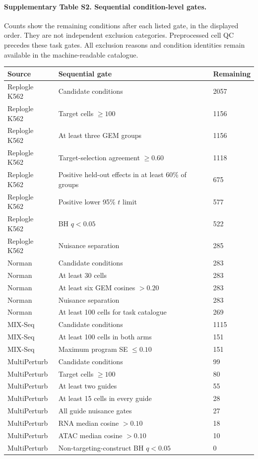 \documentclass[a4paper,fleqn]{cas-sc}
\makeatletter
\DeclareRobustCommand{\rev}[1]{{\color{red}\def\@citecolor{black}\def\@linkcolor{red}\def\@urlcolor{red}#1}}
\makeatother
\begin{document}
\paragraph{Supplementary Table S2. Sequential condition-level gates.}
Counts show the remaining conditions after each listed gate, in the displayed order. They are not independent exclusion categories. Preprocessed cell QC precedes these task gates. All exclusion reasons and condition identities remain available in the machine-readable catalogue.
\begin{longtable}{p{}p{}p{}}
\toprule
\rev{Source} & \rev{Sequential gate} & \rev{Remaining}\\
\midrule
\endhead
\rev{Replogle K562} & \rev{Candidate conditions} & \rev{2057}\\
\rev{Replogle K562} & \rev{Target cells $\geq100$} & \rev{1156}\\
\rev{Replogle K562} & \rev{At least three GEM groups} & \rev{1156}\\
\rev{Replogle K562} & \rev{Target-selection agreement $\geq0.60$} & \rev{1118}\\
\rev{Replogle K562} & \rev{Positive held-out effects in at least 60\% of groups} & \rev{675}\\
\rev{Replogle K562} & \rev{Positive lower 95\% $t$ limit} & \rev{577}\\
\rev{Replogle K562} & \rev{BH $q<0.05$} & \rev{522}\\
\rev{Replogle K562} & \rev{Nuisance separation} & \rev{285}\\
\rev{Norman} & \rev{Candidate conditions} & \rev{283}\\
\rev{Norman} & \rev{At least 30 cells} & \rev{283}\\
\rev{Norman} & \rev{At least six GEM cosines $>0.20$} & \rev{283}\\
\rev{Norman} & \rev{Nuisance separation} & \rev{283}\\
\rev{Norman} & \rev{At least 100 cells for task catalogue} & \rev{269}\\
\rev{MIX-Seq} & \rev{Candidate conditions} & \rev{1115}\\
\rev{MIX-Seq} & \rev{At least 100 cells in both arms} & \rev{151}\\
\rev{MIX-Seq} & \rev{Maximum program SE $\leq0.10$} & \rev{151}\\
\rev{MultiPerturb} & \rev{Candidate conditions} & \rev{99}\\
\rev{MultiPerturb} & \rev{Target cells $\geq100$} & \rev{80}\\
\rev{MultiPerturb} & \rev{At least two guides} & \rev{55}\\
\rev{MultiPerturb} & \rev{At least 15 cells in every guide} & \rev{28}\\
\rev{MultiPerturb} & \rev{All guide nuisance gates} & \rev{27}\\
\rev{MultiPerturb} & \rev{RNA median cosine $>0.10$} & \rev{18}\\
\rev{MultiPerturb} & \rev{ATAC median cosine $>0.10$} & \rev{10}\\
\rev{MultiPerturb} & \rev{Non-targeting-construct BH $q<0.05$} & \rev{0}\\
\bottomrule
\end{longtable}
\end{document}
